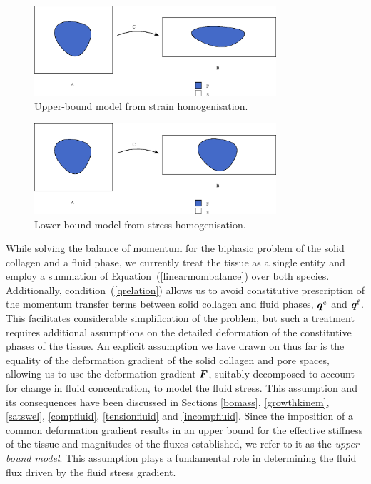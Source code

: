 \begin{figure}[ht]
  \centering
  \includegraphics[width=0.8\textwidth]
                  {images/elucidation/homogeneous-deformation}
  \caption{Upper-bound model from strain homogenisation.}
  \label{upper-bound-model}
\end{figure}

\begin{figure}[ht]
  \centering
  \includegraphics[width=0.8\textwidth]
                  {images/elucidation/homogeneous-stress}
  \caption{Lower-bound model from stress homogenisation.}
  \label{lower-bound-model}
\end{figure}

While solving the balance of momentum for the biphasic problem
of the solid collagen and a fluid phase, we currently treat the
tissue as a single entity and employ a summation of
Equation~(\ref{linearmombalance}) over both species. Additionally,
condition~(\ref{qrelation}) allows us to avoid constitutive
prescription of the momentum transfer terms between solid collagen and
fluid phases,
$\mbox{\boldmath$ q$}^\mathrm{c}$ and $\mbox{\boldmath$ q$}^\mathrm{f}$. This facilitates considerable
simplification of the 
problem, but such a treatment requires additional assumptions on the
detailed deformation of the constitutive phases of the tissue. An
explicit assumption we have drawn on thus far is the equality of
the deformation gradient of the solid collagen and pore spaces,
allowing us to use the deformation gradient
$\mbox{\boldmath$ F$}$, suitably decomposed to account for change in fluid
concentration, to model the fluid stress. This assumption and its 
consequences have been discussed in Sections \ref{bomass},
\ref{growthkinem}, \ref{satswel}, \ref{compfluid}, \ref{tensionfluid}
and \ref{incompfluid}. Since the imposition of a common deformation gradient
results in an upper bound for the 
effective stiffness of the tissue and magnitudes of the fluxes
established, we refer to it as the {\em upper bound model}. This
assumption plays a fundamental role in determining the fluid flux driven
by the fluid stress gradient.

